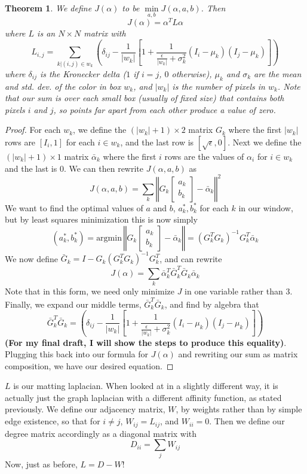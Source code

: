 \newtheorem{matlapthm}{Theorem}
\begin{matlapthm}
We define $J(\alpha)$ to be $\min\limits_{a,b} J(\alpha,a,b)$. Then
\[J(\alpha)=\alpha^{T}L\alpha\]
where $L$ is an $N\times N$ matrix with
\[L_{i,j}=\sum_{k|(i,j)\in w_k}\left(
	\delta_{ij}-\frac{1}{|w_k|}\left[
	1+\frac{1}{\frac{\epsilon}{|w_k|}+\sigma_k^2}
	(I_i-\mu_k)(I_j-\mu_k)
\right]\right)\]
where $\delta_{ij}$ is the Kronecker delta ($1$ if $i=j$, $0$ otherwise), $\mu_k$ and $\sigma_k$ are the mean and std. dev. of the color in box $w_k$, and $|w_k|$ is the number of pixels in $w_k$. Note that our sum is over each small box (usually of fixed size) that contains both pixels $i$ and $j$, so points far apart from each other produce a value of zero.
\end{matlapthm}
\begin{proof}
For each $w_k$, we define the $(|w_k|+1)\times2$ matrix $G_k$ where the first $|w_k|$ rows are $[I_i,1]$ for each $i\in w_k$, and the last row is $[\sqrt{\epsilon},0]$. Next we define the $(|w_k|+1)\times1$ matrix $\bar{\alpha}_k$ where the first $i$ rows are the values of $\alpha_i$ for $i\in w_k$ and the last is $0$. We can then rewrite $J(\alpha,a,b)$ as
\[J(\alpha,a,b)=\sum_k\left\Vert
G_k\left[\begin{array}{cc}
a_k \\ b_k
\end{array}\right]
 - \bar{\alpha}_k
\right\Vert^2\]
We want to find the optimal values of $a$ and $b$, $a_k^{*},b_k^{*}$ for each $k$ in our window, but by least squares minimization this is now simply
\[(a_k^*,b_k^*)=\text{argmin}\,
\left\Vert
G_k\left[\begin{array}{cc}
a_k \\ b_k
\end{array}\right]
 - \bar{\alpha}_k
\right\Vert=(G_k^{T}G_k)^{-1}G_k^{T}\bar{\alpha}_k\]
We now define $\bar{G}_k=I-G_k(G_k^TG_k)^{-1}G_k^T$, and can rewrite
\[J(\alpha)=
	\sum_k\bar{\alpha}_k^T\bar{G}_k^T
	      \bar{G}_k\bar{\alpha}_k\]
Note that in this form, we need only minimize $J$ in one variable rather than $3$. Finally, we expand our middle terms, $\bar{G}_k^T \bar{G}_k$, and find by algebra that
\[\bar{G}_k^T \bar{G}_k=\left(
	\delta_{ij}-\frac{1}{|w_k|}\left[
	1+\frac{1}{\frac{\epsilon}{|w_k|}+\sigma_k^2}
	(I_i-\mu_k)(I_j-\mu_k)
\right]\right)\]
\textbf{(For my final draft, I will show the steps to produce this equality)}. Plugging this back into our formula for $J(\alpha)$ and rewriting our sum as matrix composition, we have our desired equation.
\end{proof}
$L$ is our matting laplacian. When looked at in a slightly different way, it is actually just the graph laplacian with a different affinity function, as stated previously. We define our adjacency matrix, $W$, by weights rather than by simple edge existence, so that for $i\neq j$, $W_{ij}=L_{ij}$, and $W_{ii}=0$. Then we define our degree matrix accordingly as a diagonal matrix with
\[D_{ii}=\sum_j W_{ij}\]
Now, just as before, $L=D-W$!